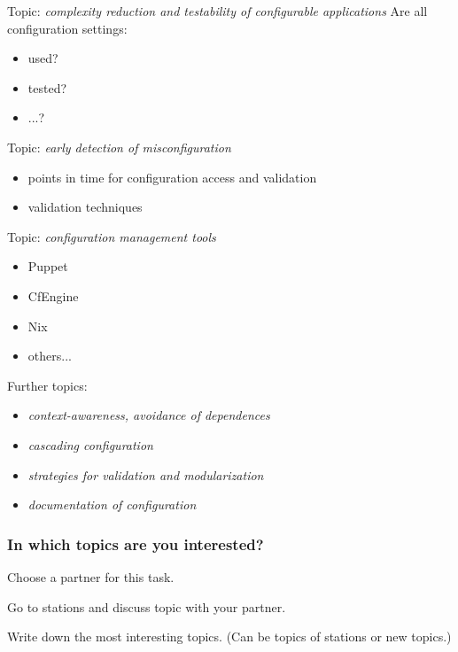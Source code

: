 \documentclass{beamer}
\begin{document}
\begin{frame}
	Topic: \textit{complexity reduction and testability of configurable applications}
	Are all configuration settings:
	\begin{itemize}
		\item used?
		\item tested?
		\item ...?
	\end{itemize}
\end{frame}

\begin{frame}
	Topic: \textit{early detection of misconfiguration}
	\begin{itemize}
		\item points in time for configuration access and validation
		\item validation techniques
	\end{itemize}
\end{frame}

\begin{frame}
	Topic: \textit{configuration management tools}
	\begin{itemize}
		\item Puppet
		\item CfEngine
		\item Nix
		\item others...
	\end{itemize}
\end{frame}

\begin{frame}
	Further topics:
	\begin{itemize}
		\item \textit{context-awareness, avoidance of dependences}
		\item \textit{cascading configuration}
		\item \textit{strategies for validation and modularization}
		\item \textit{documentation of configuration}
	\end{itemize}
\end{frame}

\begin{assignment}
	\frametitle{In which topics are you interested?}
	\begin{task}[1]
	Choose a partner for this task.
	\end{task}

	\begin{task}[2]
	Go to stations and discuss topic with your partner.
	\end{task}

	\begin{task}[3]
	Write down the most interesting topics.
	(Can be topics of stations or new topics.)
	\end{task}
\end{assignment}
\end{document}
